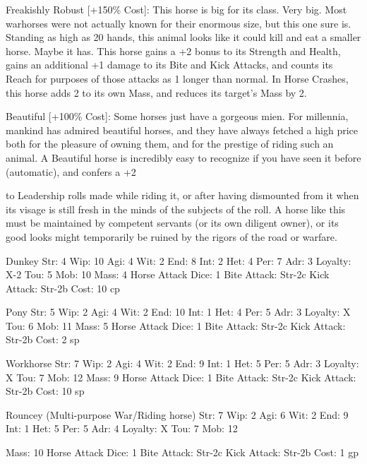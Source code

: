 \documentclass[oneside,11pt,english]{book}
\begin{document}
 

Freakishly Robust [+150\% Cost]: This horse is big for its class. Very big. Most warhorses were not 
actually known for their enormous size, but this one sure is. Standing as high as 20 hands, this animal 
looks like it could kill and eat a smaller horse. 
Maybe it has. 
This horse gains a +2 bonus to its Strength and Health, gains an additional +1 damage to its Bite and Kick 
Attacks, and counts its Reach for purposes of those attacks as 1 longer than normal. In Horse Crashes, this 
horse adds 2 to its own Mass, and reduces its target’s Mass by 2. 

 

Beautiful [+100\% Cost]: Some horses just have a gorgeous mien. For millennia, mankind has admired 
beautiful horses, and they have always fetched a high price both for the pleasure of owning them, and for 
the prestige of riding such an animal. 
A Beautiful horse is incredibly easy to recognize if you have seen it before (automatic), and confers a +2 


to Leadership rolls made while riding it, or after having dismounted from it when its visage is still fresh in 
the minds of the subjects of the roll. 
A horse like this must be maintained by competent servants (or its own diligent owner), or its good looks 
might temporarily be ruined by the rigors of the road or warfare. 

 

Dunkey 
Str: 4 Wip: 10 
Agi: 4 Wit: 2 
End: 8 Int: 2 
Het: 4 Per: 7 
Adr: 3 Loyalty: X-2 
Tou: 5 Mob: 10 
Mass: 4 
Horse Attack Dice: 1 
Bite Attack: Str-2c 
Kick Attack: Str-2b 
Cost: 10 cp 

 

Pony 
Str: 5 Wip: 2 
Agi: 4 Wit: 2 
End: 10 Int: 1 
Het: 4 Per: 5 
Adr: 3 Loyalty: X 
Tou: 6 Mob: 11 
Mass: 5 
Horse Attack Dice: 1 
Bite Attack: Str-2c 
Kick Attack: Str-2b 
Cost: 2 sp 

 

Workhorse 
Str: 7 Wip: 2 
Agi: 4 Wit: 2 
End: 9 Int: 1 
Het: 5 Per: 5 
Adr: 3 Loyalty: X 
Tou: 7 Mob: 12 
Mass: 9 
Horse Attack Dice: 1 
Bite Attack: Str-2c 
Kick Attack: Str-2b 
Cost: 10 sp 

 

Rouncey (Multi-purpose War/Riding horse) 
Str: 7 Wip: 2 
Agi: 6 Wit: 2 
End: 9 Int: 1 
Het: 5 Per: 5 
Adr: 4 Loyalty: X 
Tou: 7 Mob: 12 


Mass: 10 
Horse Attack Dice: 1 
Bite Attack: Str-2c 
Kick Attack: Str-2b 
Cost: 1 gp 
\end{document}
